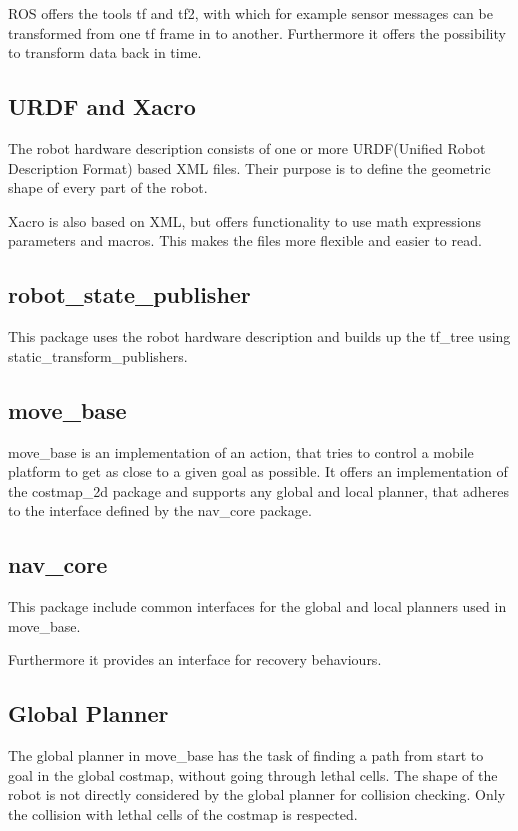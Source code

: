 ROS offers the tools tf and tf2, with which for example sensor messages can be transformed from one tf frame in to another. Furthermore it offers the possibility to transform data back in time.

\subsection{URDF and Xacro}
The robot hardware description consists of one or more URDF(Unified Robot Description Format) based XML files. Their purpose is to define the geometric shape of every part of the robot. 

Xacro is also based on XML, but offers functionality to use math expressions parameters and macros. This makes the files more flexible and easier to read.

\subsection{robot\_state\_publisher}
	This package uses the robot hardware description and builds up the tf\_tree using static\_transform\_publishers.


\subsection{move\_base}
move\_base is an implementation of an action, that tries to control a mobile platform to get as close to a given goal as possible. It offers an implementation of the costmap\_2d package and supports any global and local planner, that adheres to the interface defined by the nav\_core package\cite{movebase}.

\subsection{nav\_core}
This package include common interfaces for the global and local planners used in move\_base.

Furthermore it provides an interface for recovery behaviours\cite{navcore}.

\subsection{Global Planner}
The global planner in move\_base has the task of finding a path from start to goal in the global costmap, without going through lethal cells. The shape of the robot is not directly considered by the global planner for collision checking. Only the collision with lethal cells of the costmap is respected.

